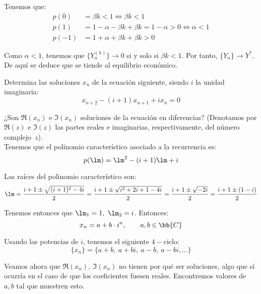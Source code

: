 \begin{ejercicio}
    Tenemos que:
    \begin{align*}
        p(0) &= \beta k < 1 \Longleftrightarrow \beta k < 1\\
        p(1) &= 1-\alpha-\beta k + \beta k = 1-\alpha > 0 \Longleftrightarrow \alpha < 1 \\
        p(-1) &= 1+\alpha+\beta k + \beta k > 0
    \end{align*}

    Como $\alpha<1$, tenemos que $\{Y_n^{(h)}\}\to 0$
    si y solo si $\beta k < 1$. Por tanto, $\{Y_n\}\to Y^\ast$. De aquí se deduce que se tiende al equilibrio económico.
\end{ejercicio}

\begin{ejercicio}
    Determina las soluciones $x_n$ de la ecuación siguiente, siendo $i$ la unidad imaginaria:
    \begin{equation*}
        x_{n+2} - (i + 1)x_{n+1} + ix_n = 0
    \end{equation*}
    
    ¿Son $\Re(x_n)$ e $\Im(x_n)$ soluciones de la ecuación en diferencias? (Denotamos por $\Re(z)$ e $\Im(z)$ las partes reales e imaginarias, respectivamente, del número complejo~$z$).\\

    Tenemos que el polinomio característico asociado a la recurrencia es:
    \begin{equation*}
        p(\lm)=\lm^2-(i+1)\lm + i
    \end{equation*}

    Las raíces del polinomio característico son:
    \begin{equation*}
        \lm = \frac{i+1 \pm \sqrt{(i+1)^2-4i}}{2}
        = \frac{i+1 \pm \sqrt{i^2+2i+1-4i}}{2}
        = \frac{i+1 \pm \sqrt{-2i}}{2}
        = \frac{i+1 \pm (1-i)}{2}
    \end{equation*}

    Tenemos entonces que $\lm_1=1,~\lm_2=i$. Entonces:
    \begin{equation*}
        x_n = a + b\cdot i^n,\qquad a,b\in \bb{C}
    \end{equation*}

    Usando las potencias de $i$, tenemos el siguiente $4-$ciclo:
    \begin{equation*}
        \{x_n\} = \{a+b,~a+bi,~a-b,~a-bi,\dots\}
    \end{equation*}

    Veamos ahora que $\Re(x_n),~\Im(x_n)$ no tienen por qué ser soluciones, algo que sí ocurría en el caso de que los coeficientes fuesen reales. Encontremos valores de $a,b$ tal que muestren esto. \\
    

\end{ejercicio}
